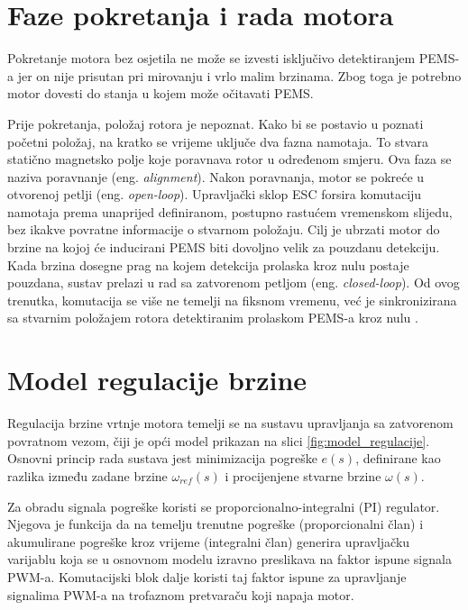 \documentclass[diplomskirad, upload]{fer}
\begin{document}
\newpage

\section{Faze pokretanja i rada motora}
\label{sec:pokretanje}

Pokretanje motora bez osjetila ne može se izvesti isključivo detektiranjem
PEMS-a jer on nije prisutan pri mirovanju i vrlo malim brzinama. Zbog toga je
potrebno motor dovesti do stanja u kojem može očitavati PEMS.

Prije pokretanja, položaj rotora je nepoznat. Kako bi se postavio u poznati
početni položaj, na kratko se vrijeme uključe dva fazna namotaja. To stvara
statično magnetsko polje koje poravnava rotor u određenom smjeru. Ova faza se
naziva poravnanje (eng. \textit{alignment}). Nakon poravnanja, motor se pokreće
u otvorenoj petlji (eng. \textit{open-loop}). Upravljački sklop ESC forsira
komutaciju namotaja prema unaprijed definiranom, postupno rastućem vremenskom
slijedu, bez ikakve povratne informacije o stvarnom položaju. Cilj je ubrzati
motor do brzine na kojoj će inducirani PEMS biti dovoljno velik za pouzdanu
detekciju. Kada brzina dosegne prag na kojem detekcija prolaska kroz nulu
postaje pouzdana, sustav prelazi u rad sa zatvorenom petljom (eng.
\textit{closed-loop}). Od ovog trenutka, komutacija se više ne temelji na
fiksnom vremenu, već je sinkronizirana sa stvarnim položajem rotora
detektiranim prolaskom PEMS-a kroz nulu \cite{Recasens2021}.

\section{Model regulacije brzine}
\label{sec:model_motora}

Regulacija brzine vrtnje motora temelji se na sustavu upravljanja sa zatvorenom
povratnom vezom, čiji je opći model prikazan na slici
\ref{fig:model_regulacije}. Osnovni princip rada sustava jest minimizacija
pogreške $e(s)$, definirane kao razlika između zadane brzine $\omega_{ref}(s)$
i procijenjene stvarne brzine $\omega(s)$.

Za obradu signala pogreške koristi se proporcionalno-integralni (PI) regulator.
Njegova je funkcija da na temelju trenutne pogreške (proporcionalni član) i
akumulirane pogreške kroz vrijeme (integralni član) generira upravljačku
varijablu koja se u osnovnom modelu izravno preslikava na faktor ispune signala
PWM-a. Komutacijski blok dalje koristi taj faktor ispune za upravljanje
signalima PWM-a na trofaznom pretvaraču koji napaja motor.
\end{document}
